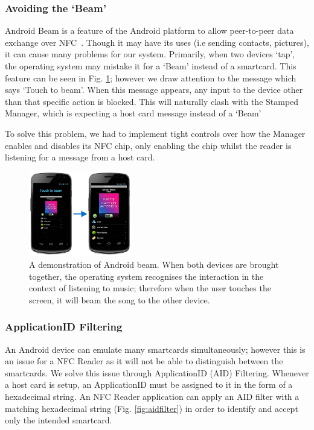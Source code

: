 \subsubsection{Avoiding the `Beam'}
Android Beam is a feature of the Android platform to allow peer-to-peer data exchange over NFC~\cite{androidBeam}. Though it may have its uses (i.e sending contacts, pictures), it can cause many problems for our system. Primarily, when two devices `tap', the operating system may mistake it for a `Beam' instead of a smartcard. This feature can be seen in Fig. \ref{fig:androidBeam}; however we draw attention to the message which says `Touch to beam'. When this message appears, any input to the device other than that specific action is blocked. This will naturally clash with the Stamped Manager, which is expecting a host card message instead of a `Beam'

To solve this problem, we had to implement tight controls over how the Manager enables and disables its NFC chip, only enabling the chip whilst the reader is listening for a message from a host card.

\begin{figure}[H]
 \centering
  \includegraphics[width=0.40\textwidth]{img/androidBeam.jpg}
     \caption{A demonstration of Android beam. When both devices are brought together, the operating system recognises the interaction in the context of listening to music; therefore when the user touches the screen, it will beam the song to the other device.}
     \label{fig:androidBeam}
\end{figure}

\subsubsection{ApplicationID Filtering}
An Android device can emulate many smartcards simultaneously; however this is an issue for a NFC Reader as it will not be able to distinguish between the smartcards. We solve this issue through ApplicationID (AID) Filtering. Whenever a host card is setup, an ApplicationID must be assigned to it in the form of a hexadecimal string. An NFC Reader application can apply an AID filter with a matching hexadecimal string (Fig. \ref{fig:aidfilter}) in order to identify and accept only the intended smartcard.

